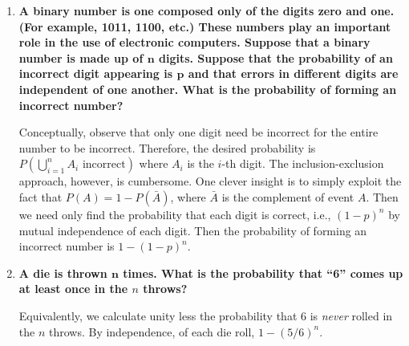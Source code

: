 \documentclass[10pt, oneside]{article}
\begin{document}
\begin{enumerate}[label=3.\arabic*]
\begin{enumerate}
	The probability of an even die roll is $1/2$ and drawing a red card, $1/2$. Therefore, by independence, $P(\text{even } \cap \text{ red}) = 1/2 \cdot 1/2 = \boxed{1/4}$.
	
	\item  \begin{tcolorbox}[
	  colback=Cerulean!5!white,
	  colframe=Cerulean!75!black]
	\textbf{the die shows an even number or the card is from a red suit?}
	\end{tcolorbox}
	
	Using the previous result, $P(\text{even } \cup \text{ red}) = P(\text{even}) + P(\text{red}) - P(\text{even } \cap \text{ red}) = 1/2 + 1/2 - 1/4 = \boxed{3/4}$.
	\end{enumerate}

\item  \begin{tcolorbox}[
  colback=Cerulean!5!white,
  colframe=Cerulean!75!black]
\textbf{A binary number is one composed only of the digits zero and one. (For example, 1011, 1100, etc.) These numbers play an important role in the use of electronic computers. Suppose that a binary number is made up of $\bm{n}$ digits. Suppose that the probability of an incorrect digit appearing is $\bm{p}$ and that errors in different digits are independent of one another. What is the probability of forming an incorrect number?}
\end{tcolorbox}

Conceptually, observe that only one digit need be incorrect for the entire number to be incorrect. Therefore, the desired probability is $P(\bigcup^n_{i=1} A_i \text{ incorrect})$ where $A_i$ is the $i$-th digit. The inclusion-exclusion approach, however, is cumbersome. One clever insight is to simply exploit the fact that $P(A) = 1 - P(\bar{A})$, where $\bar{A}$ is the complement of event $A$. Then we need only find the probability that each digit is correct, i.e., $(1-p)^n$ by mutual independence of each digit. Then the probability of forming an incorrect number is $\boxed{1 - (1-p)^n}$.

\item  \begin{tcolorbox}[
  colback=Cerulean!5!white,
  colframe=Cerulean!75!black]
\textbf{A die is thrown $\bm{n}$ times. What is the probability that ``6'' comes up at least once in the $n$ throws?}
\end{tcolorbox}

Equivalently, we calculate unity less the probability that 6 is \textit{never} rolled in the $n$ throws. By independence, of each die roll, $\boxed{1 - (5/6)^n}$.


\end{enumerate}
\end{document}
